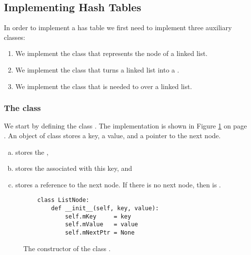 \subsection{Implementing Hash Tables}
In order to implement a has table we first need to implement three auxiliary classes:
\begin{enumerate}
\item We implement the class  that represents the node of a linked list.
\item We implement the class  that turns a linked list into a .
\item We implement  the class  that is needed to  over a linked list.
\end{enumerate}

\subsubsection{The class }
We start by defining the class .
The implementation is shown in Figure \ref{fig:ListNode.ipynb} on page \pageref{fig:ListNode.ipynb}.
An object of class  stores a key, a value, and a pointer to the next node.
\begin{enumerate}[(a)]
\item {}     stores the ,
\item {}   stores the  associated with this key, and
\item {} stores a reference to the next node.  If there is no next node, then 
       is .
\end{enumerate}

\begin{figure}[!ht]
\centering
\begin{verbatim}
    class ListNode:
        def __init__(self, key, value):
            self.mKey     = key
            self.mValue   = value
            self.mNextPtr = None                
\end{verbatim}
\vspace*{-0.3cm}
\caption{The constructor of the class .}
\label{fig:ListNode.ipynb}
\end{figure}

